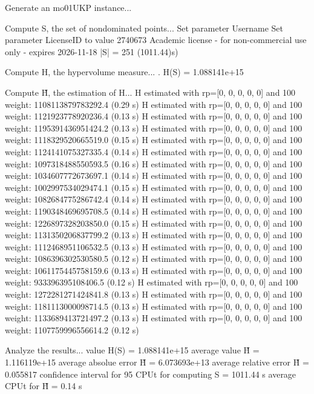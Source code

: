 Generate an mo01UKP instance...

Compute S, the set of nondominated points...
Set parameter Username
Set parameter LicenseID to value 2740673
Academic license - for non-commercial use only - expires 2026-11-18
  |S|  = 251 (1011.44)s)

Compute H, the hypervolume measure...
. H(S) = 1.088141e+15

Compute H̃, the estimation of H...
  H estimated with rp=[0, 0, 0, 0, 0] and 100 weight:  1108113879783292.4  (0.29 s)
  H estimated with rp=[0, 0, 0, 0, 0] and 100 weight:  1121923778920236.4  (0.13 s)
  H estimated with rp=[0, 0, 0, 0, 0] and 100 weight:  1195391436951424.2  (0.13 s)
  H estimated with rp=[0, 0, 0, 0, 0] and 100 weight:  1118329520665519.0  (0.15 s)
  H estimated with rp=[0, 0, 0, 0, 0] and 100 weight:  1124141075327335.4  (0.14 s)
  H estimated with rp=[0, 0, 0, 0, 0] and 100 weight:  1097318488550593.5  (0.16 s)
  H estimated with rp=[0, 0, 0, 0, 0] and 100 weight:  1034607772673697.1  (0.14 s)
  H estimated with rp=[0, 0, 0, 0, 0] and 100 weight:  1002997534029474.1  (0.15 s)
  H estimated with rp=[0, 0, 0, 0, 0] and 100 weight:  1082684775286742.4  (0.14 s)
  H estimated with rp=[0, 0, 0, 0, 0] and 100 weight:  1190348469695708.5  (0.14 s)
  H estimated with rp=[0, 0, 0, 0, 0] and 100 weight:  1226897328203850.0  (0.15 s)
  H estimated with rp=[0, 0, 0, 0, 0] and 100 weight:  1131350206837799.2  (0.13 s)
  H estimated with rp=[0, 0, 0, 0, 0] and 100 weight:  1112468951106532.5  (0.13 s)
  H estimated with rp=[0, 0, 0, 0, 0] and 100 weight:  1086396302530580.5  (0.12 s)
  H estimated with rp=[0, 0, 0, 0, 0] and 100 weight:  1061175445758159.6  (0.13 s)
  H estimated with rp=[0, 0, 0, 0, 0] and 100 weight:  933396395108406.5  (0.12 s)
  H estimated with rp=[0, 0, 0, 0, 0] and 100 weight:  1272281271424841.8  (0.13 s)
  H estimated with rp=[0, 0, 0, 0, 0] and 100 weight:  1181113000098714.5  (0.13 s)
  H estimated with rp=[0, 0, 0, 0, 0] and 100 weight:  1133689413721497.2  (0.13 s)
  H estimated with rp=[0, 0, 0, 0, 0] and 100 weight:  1107759996556614.2  (0.12 s)

Analyze the results...
  value H(S)                  = 1.088141e+15 
  average value H̃             = 1.116119e+15 
  average absolue error H̃     = 6.073693e+13 
  average relative error H̃    = 0.055817 
  confidence interval for 95%
  CPUt for computing S         = 1011.44 s
  average CPUt for H̃           = 0.14 s

